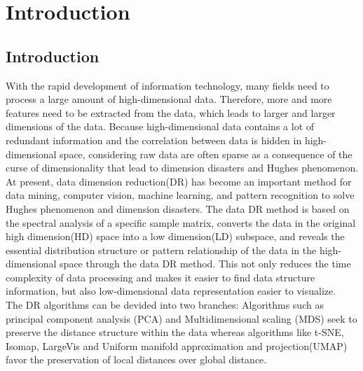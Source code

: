 \part{Introduction} \label{part:how is the conclusion}

\chapter{Introduction}


With the rapid development of information technology, many fields need to process a large amount of high-dimensional data. Therefore, more and more features need to be extracted from the data, which leads to larger and larger dimensions of the data. Because high-dimensional data contains a lot of redundant information and the correlation between data is hidden in high-dimensional space, considering raw data are often sparse as a consequence of the curse of dimensionality that lead to dimension disasters and Hughes phenomenon.\\

\noindent At present, data dimension reduction(DR) has become an important method for data mining, computer vision, machine learning, and pattern recognition to solve Hughes phenomenon and dimension disasters. The data DR method is based on the spectral analysis of a specific sample matrix, converts the data in the original high dimension(HD) space into a low dimension(LD) subspace, and reveals the essential distribution structure or pattern relationship of the data in the high-dimensional space through the data DR method. This not only reduces the time complexity of data processing and makes it easier to find data structure information, but also low-dimensional data representation easier to visualize.\\


\noindent The DR algorithms can be devided into two branches: Algorithms such as principal component analysis (PCA)\cite{ref10} and Multidimensional scaling (MDS)\cite{ref14} seek to preserve the distance structure within the data whereas algorithms like t-SNE\cite{ref13}, Isomap\cite{ref16}, LargeVis\cite{ref5} and Uniform manifold approximation and projection(UMAP)\cite{ref17} favor the preservation of local distances over global distance.\\

